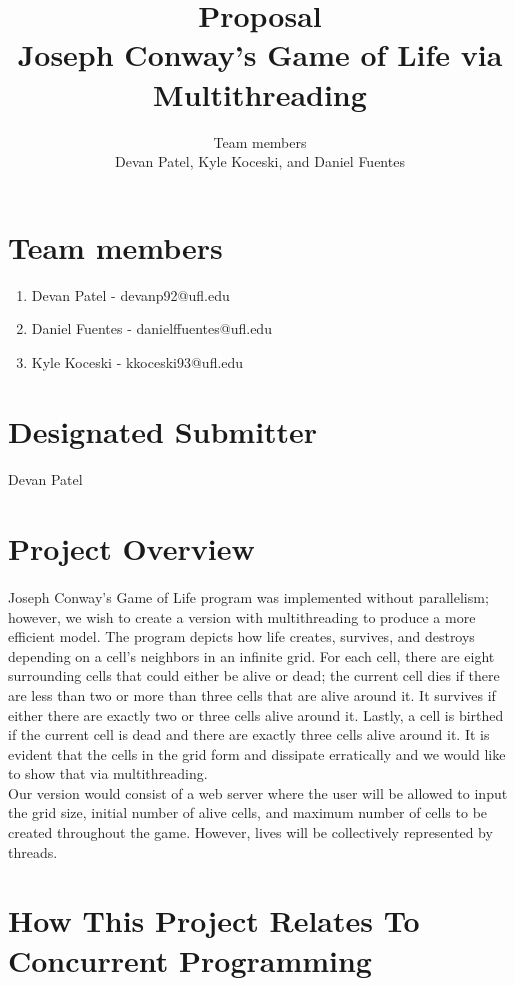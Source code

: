 \documentclass[12pt,a4paper]{report}
\author{Team members \\{\normalsize Devan Patel, Kyle Koceski, and Daniel Fuentes}}
\title{Proposal \\ {\large Joseph Conway's Game of Life via Multithreading} }
\begin{document}
\maketitle
\newpage
\section{Team members}
\begin{enumerate}
\item Devan Patel - devanp92@ufl.edu
\item Daniel Fuentes - danielffuentes@ufl.edu
\item Kyle Koceski - kkoceski93@ufl.edu
\end{enumerate}
\section{Designated Submitter}
\paragraph{}
Devan Patel
\section{Project Overview}
\paragraph{}
Joseph Conway’s Game of Life program was implemented without parallelism; however, we wish to create a version with multithreading to produce a more efficient model. The program depicts how life creates, survives, and destroys depending on a cell’s neighbors in an infinite grid. For each cell, there are eight surrounding cells that could either be alive or dead; the current cell dies if there are less than two or more than three cells that are alive around it. It survives if either there are exactly two or three cells alive around it. Lastly, a cell is birthed if the current cell is dead and there are exactly three cells alive around it. It is evident that the cells in the grid form and dissipate erratically and we would like to show that via multithreading.\\
\indent Our version would consist of a web server where the user will be allowed to input the grid size, initial number of alive cells, and maximum number of cells to be created throughout the game. However, lives will be collectively represented by threads.
\section{How This Project Relates To Concurrent Programming}
\end{document}
